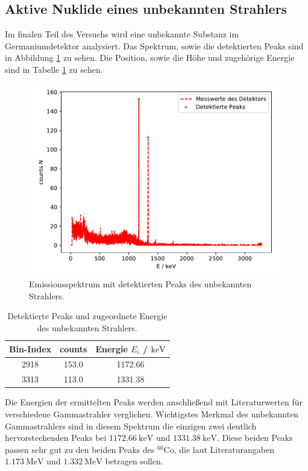 \subsection{Aktive Nuklide eines unbekannten Strahlers}
Im finalen Teil des Versuchs wird eine unbekannte Substanz im Germaniumdetektor analysiert. Das Spektrum, sowie die detektierten Peaks sind in Abbildung \ref{abb:unbekannt} zu sehen. Die Position, sowie die Höhe und zugehörige Energie sind in Tabelle \ref{tab:unbekannt} zu sehen.
\FloatBarrier
\begin{figure}
    \centering
    \includegraphics[scale=0.7]{unbekannterStrahler.pdf}
    \caption{Emissionsspektrum mit detektierten Peaks des unbekannten Strahlers.}
    \label{abb:unbekannt}
\end{figure}
\FloatBarrier
\begin{table}
    \centering
    \caption{Detektierte Peaks und zugeordnete Energie des unbekannten Strahlers.}
    \label{tab:unbekannt}
    \begin{tabular}{ c c c }
    \toprule
    {Bin-Index} & {counts } & {Energie $E_i$ / $\si{\kilo\electronvolt}$}\\
    \midrule
    2918 & 153.0 & 1172.66       \\
    3313 & 113.0 & 1331.38       \\
    \bottomrule
    \end{tabular}
\end{table}
\FloatBarrier

\noindent Die Energien der ermittelten Peaks werden anschließend mit Literaturwerten für verschiedene Gammastrahler verglichen. Wichtigstes Merkmal des unbekannten Gammastrahlers sind in diesem Spektrum die einzigen zwei deutlich hervorstechenden Peaks bei $\SI{1172,66}{\kilo \electronvolt}$ und $\SI{1331,38}{\kilo \electronvolt}$. Diese beiden Peaks passen sehr gut zu den beiden Peaks des $^{60}$Co, die laut Literaturangaben \cite{Q4} $\SI{1,173}{\mega \electronvolt}$ und $\SI{1,332}{\mega \electronvolt}$ betragen sollen.

